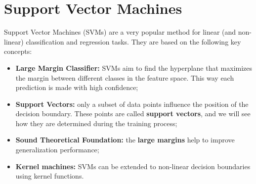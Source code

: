 \section{Support Vector Machines}
Support Vector Machines (SVMs) are a very popular method for linear (and non-linear) classification and regression tasks.
They are based on the following key concepts:
\begin{itemize}
    \item \textbf{Large Margin Classifier:} SVMs aim to find the hyperplane that maximizes 
    the margin between different classes in the feature space. This way each prediction is made with high confidence;
    \item \textbf{Support Vectors:} only a subset of data points influence the position of the decision boundary.
    These points are called \textbf{support vectors}, and we will see how they are determined during the training process;
    \item \textbf{Sound Theoretical Foundation:} the \textbf{large margins} help to improve generalization performance;
    \item \textbf{Kernel machines:} SVMs can be extended to non-linear decision boundaries using kernel functions. 
\end{itemize}

